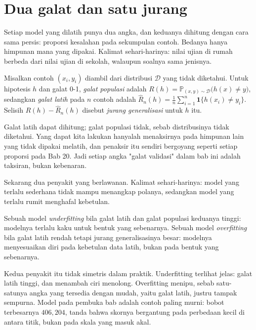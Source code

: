 \section{Dua galat dan satu jurang}

Setiap model yang dilatih punya dua angka, dan keduanya dihitung dengan cara sama
persis: proporsi kesalahan pada sekumpulan contoh. Bedanya hanya himpunan mana yang
dipakai. Kalimat sehari-harinya: nilai ujian di rumah berbeda dari nilai ujian di
sekolah, walaupun soalnya sama jenisnya.


\begin{definisi}
Misalkan contoh $(x_i,y_i)$ diambil dari distribusi $\mathcal{D}$ yang tidak diketahui.
Untuk hipotesis $h$ dan galat 0-1, \emph{galat populasi} adalah
$R(h)=\mathbb{P}_{(x,y)\sim\mathcal{D}}\bigl(h(x)\neq y\bigr)$, sedangkan \emph{galat
latih} pada $n$ contoh adalah
$\hat R_n(h)=\frac1n\sum_{i=1}^n \mathbf{1}\{h(x_i)\neq y_i\}$.
Selisih $R(h)-\hat R_n(h)$ disebut \emph{jurang generalisasi} untuk $h$ itu.
\end{definisi}

Galat latih dapat dihitung; galat populasi tidak, sebab distribusinya tidak diketahui.
Yang dapat kita lakukan hanyalah menaksirnya pada himpunan lain yang tidak dipakai
melatih, dan penaksir itu sendiri bergoyang seperti setiap proporsi pada Bab 20. Jadi
setiap angka "galat validasi" dalam bab ini adalah taksiran, bukan kebenaran.

Sekarang dua penyakit yang berlawanan. Kalimat sehari-harinya: model yang terlalu
sederhana tidak mampu menangkap polanya, sedangkan model yang terlalu rumit menghafal
kebetulan.

\begin{definisi}
Sebuah model \emph{underfitting} bila galat latih dan galat populasi keduanya tinggi:
modelnya terlalu kaku untuk bentuk yang sebenarnya. Sebuah model \emph{overfitting}
bila galat latih rendah tetapi jurang generalisasinya besar: modelnya menyesuaikan diri
pada kebetulan data latih, bukan pada bentuk yang sebenarnya.
\end{definisi}

Kedua penyakit itu tidak simetris dalam praktik. Underfitting terlihat jelas: galat latih
tinggi, dan menambah ciri menolong. Overfitting menipu, sebab satu-satunya angka yang
tersedia dengan mudah, yaitu galat latih, justru tampak sempurna. Model pada pembuka bab
adalah contoh paling murni: bobot terbesarnya $406{,}204$, tanda bahwa skornya bergantung
pada perbedaan kecil di antara titik, bukan pada skala yang masuk akal.

